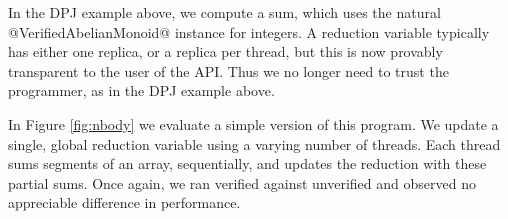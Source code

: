 


In the DPJ example above, we compute a sum, which uses the natural
@VerifiedAbelianMonoid@ instance for integers.  A reduction variable typically
has either one replica, or a replica per thread, but this is now provably
transparent to the user of the API.  Thus we no longer need to trust the programmer,
as in the DPJ example above.






In Figure \ref{fig:nbody} we evaluate a simple version of this program.  We
update a single, global reduction variable using a varying number of threads.
Each thread sums segments of an array, sequentially, and updates the reduction
with these partial sums.
%
%
Once again, we ran verified against unverified and observed no appreciable
difference in performance.

